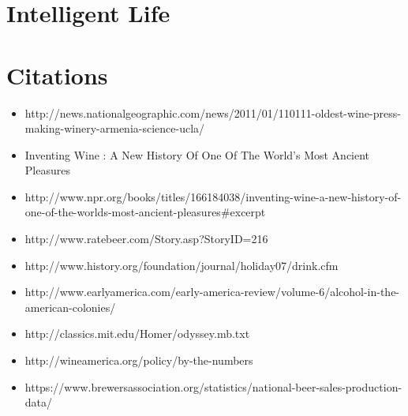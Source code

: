 \documentclass{beamer}
\begin{document}
\section{Intelligent Life}


\section{Citations}
\begin{frame}
\begin{itemize}
\item \scriptsize{http://news.nationalgeographic.com/news/2011/01/110111-oldest-wine-press-making-winery-armenia-science-ucla/}
\item \scriptsize{Inventing Wine : A New History Of One Of The World's Most Ancient Pleasures}
\item \scriptsize{http://www.npr.org/books/titles/166184038/inventing-wine-a-new-history-of-one-of-the-worlds-most-ancient-pleasures\#excerpt}
\item \scriptsize{http://www.ratebeer.com/Story.asp?StoryID=216}
\item \scriptsize{http://www.history.org/foundation/journal/holiday07/drink.cfm}
\item \scriptsize{http://www.earlyamerica.com/early-america-review/volume-6/alcohol-in-the-american-colonies/}
\item \scriptsize{http://classics.mit.edu/Homer/odyssey.mb.txt}
\item \scriptsize{http://wineamerica.org/policy/by-the-numbers}
\item \scriptsize{https://www.brewersassociation.org/statistics/national-beer-sales-production-data/}
\end{itemize}
\end{frame}
\end{document}
